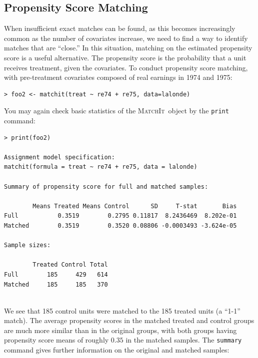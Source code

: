 \documentclass[oneside,letterpaper,titlepage]{article}
\newcommand{\MatchIt}{\textsc{MatchIt}}
\begin{document}
 
 



\subsection{Propensity Score Matching}
When insufficient exact matches can be found, as this becomes
increasingly common as the number of covariates increase, we need to
find a way to identify matches that are ``close.''  In this situation,
matching on the estimated propensity score is a useful alternative.
The propensity score is the probability that a unit receives
treatment, given the covariates.  To conduct propensity score
matching, with pre-treatment covariates composed of real earnings in
1974 and 1975:

\begin{verbatim}
> foo2 <- matchit(treat ~ re74 + re75, data=lalonde)
\end{verbatim} 

\noindent You may again check basic statistics of the \MatchIt\ object by the
\texttt{print} command:

\begin{verbatim}
> print(foo2)
 
Assignment model specification:
matchit(formula = treat ~ re74 + re75, data = lalonde)
 
Summary of propensity score for full and matched samples:
 
        Means Treated Means Control      SD     T-stat       Bias
Full           0.3519        0.2795 0.11817  8.2436469  8.202e-01
Matched        0.3519        0.3520 0.08806 -0.0003493 -3.624e-05
 
Sample sizes:
 
        Treated Control Total
Full        185     429   614
Matched     185     185   370
 
\end{verbatim} 
We see that 185 control units were matched to the 185 treated units (a
``1-1'' match).  The average propensity scores in the matched treated
and control groups are much more similar than in the original groups,
with both groups having propensity score means of roughly $0.35$ in
the matched samples.  The {\tt summary} command gives further
information on the original and matched samples:
\end{document}
